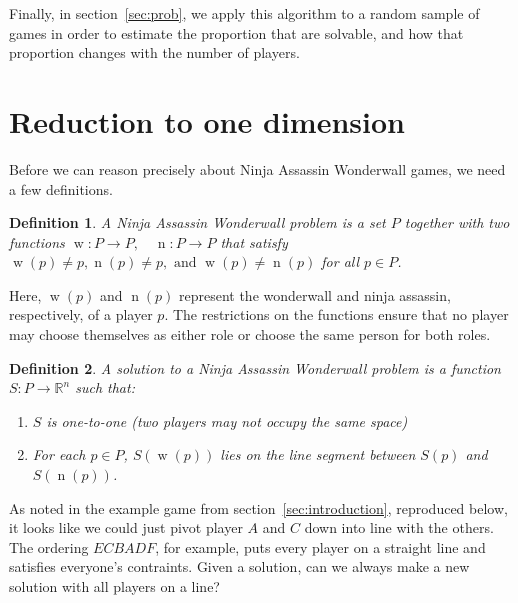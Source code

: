 \documentclass[12pt,x11names, rgb]{article}
\newtheorem*{definition}{Definition}
\DeclareMathOperator{\w}{w}
\DeclareMathOperator{\n}{n}
\begin{document}
    Finally, in section~\ref{sec:prob}, we apply this algorithm to a random sample of games in order to estimate the proportion that are solvable, and how that proportion changes with the number of players.

\section{Reduction to one dimension}
\label{sec:reduction_to_one}

    Before we can reason precisely about Ninja Assassin Wonderwall games, we need a few definitions.

    \begin{definition}
    A \emph{Ninja Assassin Wonderwall problem} is a set $P$ together with two functions $\w:P\to P, \quad \n: P\to P$ that satisfy $\w(p) \neq p, \n(p) \neq p, \text{ and } \w(p) \neq \n(p)$ for all $p \in P$.
    \end{definition}

    Here, $\w(p)$ and $\n(p)$ represent the wonderwall and ninja assassin, respectively, of a player $p$. The restrictions on the functions ensure that no player may choose themselves as either role or choose the same person for both roles. 
	
	\vspace{12pt}
    \begin{definition}
    A \emph{solution} to a Ninja Assassin Wonderwall problem is a function $S: P\to \mathbb{R}^{n}$ such that:
        \begin{enumerate}
        \item $S$ is one-to-one (two players may not occupy the same space)
        \item For each $p \in P$, $S(\w(p))$ lies on the line segment between $S(p)$ and $S(\n(p))$.
        \end{enumerate}
    \end{definition}

    As noted in the example game from section~\ref{sec:introduction}, reproduced below, it looks like we could just pivot player $A$ and $C$ down into line with the others. The ordering $ECBADF$, for example, puts every player on a straight line and satisfies everyone's contraints. Given a solution, can we always make a new solution with all players on a line?
\end{document}

